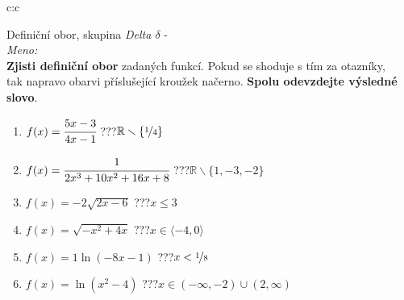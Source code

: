 \documentclass[10pt]{report}
\begin{document}
\newpage
\thispagestyle{empty}
\begin{tabular}{c:c}
\begin{minipage}[c][99mm][t]{0.49\linewidth}
\begin{center}
\vspace{7mm}
{\huge Definiční obor, skupina \textit{Delta $\delta$} -}\\[4.5mm]
\textit{Meno:}\phantom{xxxxxxxxxxxxxxxxxxxxxxxxxxxxxxxxxxxxxxxxxxxxxxxxxxxxxxxxxxxxxxxxx}\\[3.5mm]
\textbf{Zjisti definiční obor} zadaných funkcí. Pokud se shoduje s tím za otazníky,\\tak napravo obarvi příslušející kroužek načerno. \textbf{Spolu odevzdejte výsledné slovo}.\\[3mm]
\begin{minipage}{0.77\linewidth}
\begin{center}
\begin{varwidth}{\textwidth}
\begin{enumerate}
\normalsize
\item $f(x)=\cfrac{5x-3}{4x-1}$\quad \dotfill\; ???\;\dotfill \quad $\mathbb{R}\smallsetminus\{\nicefrac{1}{4}\}$
\item $f(x)=\cfrac{1}{2x^3+10x^2+16x+8}$\quad \dotfill\; ???\;\dotfill \quad $\mathbb{R}\smallsetminus\{1,-3,-2\}$
\item $f(x)=-2\sqrt{2x-6}$\quad \dotfill\; ???\;\dotfill \quad $x\leq3$
\item $f(x)=\sqrt{-x^2+4x}$\quad \dotfill\; ???\;\dotfill \quad $x\in\langle-4 , 0\rangle$
\item $f(x)=1\ln{(-8x-1)}$\quad \dotfill\; ???\;\dotfill \quad $x<\nicefrac{1}{8}$
\item $f(x)=\ln{(x^2-4)}$\quad \dotfill\; ???\;\dotfill \quad $x\in(-\infty , -2)\cup(2 , \infty)$
\end{enumerate}
\end{varwidth}
\end{center}
\end{minipage}
\begin{minipage}{0.20\linewidth}

\end{minipage}
\end{center}
\end{minipage}
\end{tabular}
\end{document}
